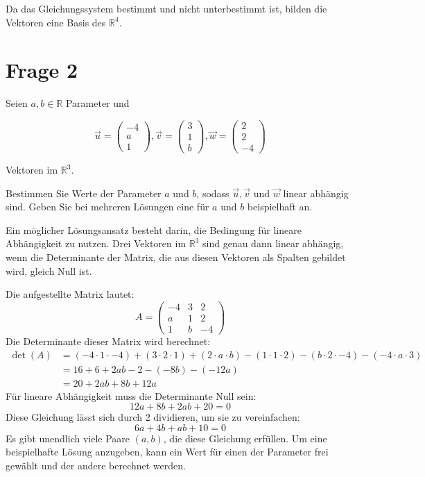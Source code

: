 Da das Gleichungssystem bestimmt und nicht unterbestimmt ist, bilden die
Vektoren eine Basis des $\mathbb{R}^4$.

\section{Frage 2}

Seien $a, b \in \mathbb{R}$ Parameter und

\[
    \vec{u}= \begin{pmatrix}
        -4 \\ a \\1
    \end{pmatrix}, \vec{v} = \begin{pmatrix}
        3 \\ 1 \\ b
    \end{pmatrix}, \vec{w} = \begin{pmatrix}
        2 \\ 2 \\ -4
    \end{pmatrix}
\]

Vektoren im $\mathbb{R}^3$.

Bestimmen Sie Werte der Parameter $a$ und $b$, sodass $\vec{u}, \vec{v}$ und
$\vec{w}$ linear abhängig sind. Geben Sie bei mehreren Lösungen eine für $a$
und $b$ beispielhaft an.

Ein möglicher Lösungsansatz besteht darin, die Bedingung für lineare
Abhängigkeit zu nutzen. Drei Vektoren im $\mathbb{R}^3$ sind genau dann linear
abhängig, wenn die Determinante der Matrix, die aus diesen Vektoren als Spalten
gebildet wird, gleich Null ist.

Die aufgestellte Matrix lautet:
\[
    A = \begin{pmatrix}
        -4 & 3 & 2  \\
        a  & 1 & 2  \\
        1  & b & -4
    \end{pmatrix}
\]
Die Determinante dieser Matrix wird berechnet:
\begin{align*}
    \det(A) & = (-4 \cdot 1 \cdot -4) + (3 \cdot 2 \cdot 1) + (2 \cdot a \cdot b) - (1 \cdot 1 \cdot 2) - (b \cdot 2 \cdot -4) - (-4 \cdot a \cdot 3) \\
            & = 16 + 6 + 2ab - 2 - (-8b) - (-12a)                                                                                                     \\
            & = 20 + 2ab + 8b + 12a
\end{align*}
Für lineare Abhängigkeit muss die Determinante Null sein:
\[
    12a + 8b + 2ab + 20 = 0
\]
Diese Gleichung lässt sich durch 2 dividieren, um sie zu vereinfachen:
\[
    6a + 4b + ab + 10 = 0
\]
Es gibt unendlich viele Paare $(a, b)$, die diese Gleichung erfüllen. Um eine
beispielhafte Lösung anzugeben, kann ein Wert für einen der Parameter frei
gewählt und der andere berechnet werden.

